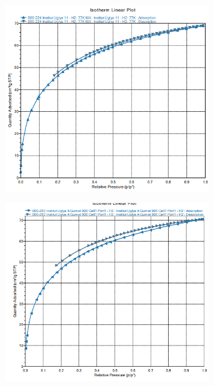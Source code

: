 \begin{figure}[H]
	\centering
	\includegraphics[width=0.8\textwidth]{media/chem2/image107}
	\caption*{}
\end{figure}

\begin{figure}[H]
	\centering
	\includegraphics[width=0.8\textwidth]{media/chem2/image108}
	\caption*{}
\end{figure}

